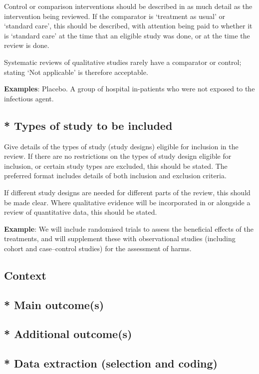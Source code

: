 \documentclass{qqtarticle}
\begin{document}
    Control or comparison interventions should be described in as much detail as the intervention being reviewed. If the
    comparator is ‘treatment as usual’ or ‘standard care’, this should be described, with attention being paid to whether it is
    ‘standard care’ at the time that an eligible study was done, or at the time the review is done.

    Systematic reviews of qualitative studies rarely have a comparator or control; stating ‘Not applicable’ is therefore
    acceptable.

    \textbf{Examples}: Placebo. A group of hospital in-patients who were not exposed to the infectious agent.


    \subsection{* Types of study to be included}
    Give details of the types of study (study designs) eligible for inclusion in the review. If there are no restrictions on the types
    of study design eligible for inclusion, or certain study types are excluded, this should be stated. The preferred format
    includes details of both inclusion and exclusion criteria.

    If different study designs are needed for different parts of the review, this should be made clear. Where qualitative
    evidence will be incorporated in or alongside a review of quantitative data, this should be stated.

    \textbf{Example}: We will include randomised trials to assess the beneficial effects of the treatments, and will supplement these
    with observational studies (including cohort and case–control studies) for the assessment of harms.

    \subsection{Context}

    \subsection{* Main outcome(s)}

    \subsection{* Additional outcome(s)}

    \subsection{* Data extraction (selection and coding)}
\end{document}
